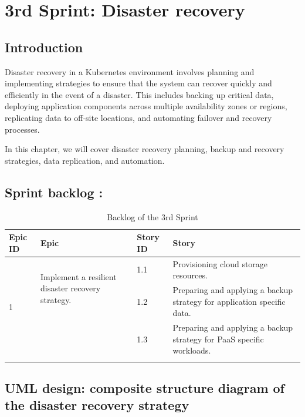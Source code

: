 \graphicspath{{./assets/}}
\setcounter{mtc}{4}
\chapter{3rd Sprint: Disaster recovery }

\section*{Introduction}

\hspace{7mm}Disaster recovery in a Kubernetes environment involves planning and implementing strategies to ensure that the system can recover quickly and efficiently in the event of a disaster. This includes backing up critical data, deploying application components across multiple availability zones or regions, replicating data to off-site locations, and automating failover and recovery processes. 

\hspace{7mm}In this chapter, we will cover disaster recovery planning, backup and recovery strategies, data replication, and automation.  

\section{Sprint backlog :}

\begin{longtable}[H]{|m{1.5cm}|m{4cm}|m{1.5cm}|m{8cm}|}
\hline
{\textbf{Epic ID}} & {\textbf{Epic}} & {\textbf{Story ID}} & {\textbf{Story}}\\
\hline
\multirow{3}{1.5cm}{1} & \multirow{2}{4cm}{Implement a resilient disaster recovery strategy.}  &  1.1	 & Provisioning cloud storage resources. \\
\cline{3-4}
& & 1.2 & Preparing and applying a backup strategy for application specific data.  \\
\cline{3-4}
& & 1.3	& Preparing and applying a backup strategy for PaaS specific workloads.   \\
\cline{3-4}
\hline
\caption{Backlog of the 3rd Sprint}
\end{longtable}

\section{UML design: composite structure diagram of the disaster recovery strategy }

